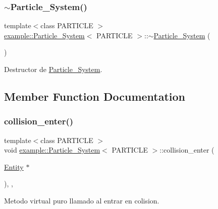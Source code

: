 \subsubsection{\texorpdfstring{$\sim$Particle\_System()}{~Particle\_System()}}
{\footnotesize\ttfamily template$<$class P\+A\+R\+T\+I\+C\+LE $>$ \\
\mbox{\hyperlink{classexample_1_1_particle___system}{example\+::\+Particle\+\_\+\+System}}$<$ P\+A\+R\+T\+I\+C\+LE $>$\+::$\sim$\mbox{\hyperlink{classexample_1_1_particle___system}{Particle\+\_\+\+System}} (\begin{DoxyParamCaption}{ }\end{DoxyParamCaption})\hspace{0.3cm}{\ttfamily [inline]}}



Destructor de \mbox{\hyperlink{classexample_1_1_particle___system}{Particle\+\_\+\+System}}. 



\subsection{Member Function Documentation}
\mbox{\label{classexample_1_1_particle___system_a7abd68650036023393e7bb7cc5d28d49}} 
\subsubsection{\texorpdfstring{collision\_enter()}{collision\_enter()}}
{\footnotesize\ttfamily template$<$class P\+A\+R\+T\+I\+C\+LE $>$ \\
void \mbox{\hyperlink{classexample_1_1_particle___system}{example\+::\+Particle\+\_\+\+System}}$<$ P\+A\+R\+T\+I\+C\+LE $>$\+::collision\+\_\+enter (\begin{DoxyParamCaption}\item[{\mbox{\hyperlink{classexample_1_1_entity}{Entity}} $\ast$}]{ }\end{DoxyParamCaption})\hspace{0.3cm}{\ttfamily [inline]}, {\ttfamily [override]}, {\ttfamily [virtual]}}



Metodo virtual puro llamado al entrar en colision. 



